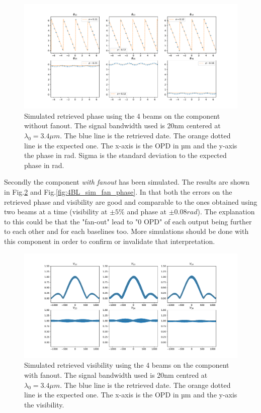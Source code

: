 \begin{figure}[htbp!]
\centering
\includegraphics[scale=.4]{../picture/4BL_20_nofan_phase.pdf}
\caption{Simulated retrieved phase using the 4 beams on the component without fanout. The signal bandwidth used is 20nm centered at $ \lambda_0=3.4 \mu m$. The blue line is the retrieved date. The orange dotted line is the expected one. The x-axis is the OPD in µm and the y-axis the phase in rad. Sigma is the standard deviation to the expected phase in rad.}
\label{fig:4BL_sim_nofan_phase}
\end{figure}

Secondly the component \emph{with fanout} has been simulated. The results are shown in Fig.\ref{fig:4BL_sim_fan} and Fig.\ref{fig:4BL_sim_fan_phase}. In that both the errors on the retrieved phase and visibility are good and comparable to the ones obtained using two beams at a time (visibility at $\pm 5\%$ and phase at $\pm 0.08 rad$). The explanation to this could be that the "fan-out" lead to "0 OPD" of each output being further to each other and for each baselines too. More simulations should be done with this component in order to confirm or invalidate that interpretation.  

\begin{figure}[htbp!]
\centering
\includegraphics[scale=.4]{../picture/4BL_20_fan.pdf}
\caption{Simulated retrieved visibility using the 4 beams on the component with fanout. The signal bandwidth used is 20nm centred at $ \lambda_0=3.4 \mu m$. The blue line is the retrieved date. The orange dotted line is the expected one. The x-axis is the OPD in µm and the y-axis the visibility.}
\label{fig:4BL_sim_fan}
\end{figure}


